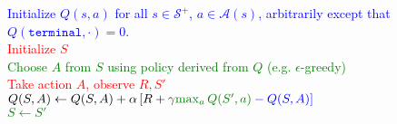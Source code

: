 \documentclass{standalone}
\begin{document}
\pagestyle{empty}
\begin{algorithm}[H]
  \KwInput{Step size $\alpha \in (0, 1]$, and a small $\epsilon > 0$.}
  \textcolor{blue}{Initialize $Q(s,a)$ for all $s \in \mathcal S^+$, $a \in \mathcal A(s)$,   arbitrarily except that $Q(\texttt{terminal}, \cdot) = 0$.\\}
 {
  \textcolor{red}{Initialize $S$} \\
   {
\textcolor{Green}{Choose $A$ from $S$ using policy derived from $Q$ (e.g. $\epsilon$-greedy)} \\
\textcolor{red}{Take action $A$, observe $R, S'$ \\}
\textcolor{blue}{
    $Q(S,A) \gets Q(S,A) + \alpha \left[R + \gamma \color{Green}{\max_a Q(S', a)} \color{blue} -       Q(S,A)\right]$ \\}
    \textcolor{Green}{$S \gets S'$} 
  }
}
\end{algorithm}
\end{document}
